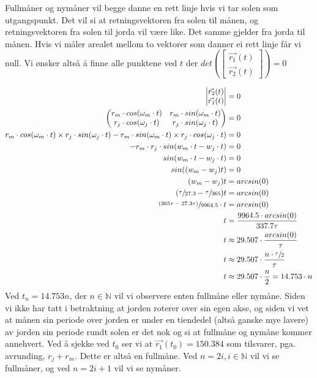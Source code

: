 \documentclass{../../myassignment}
\begin{document}
	\begin{answer}
		Fullm{\aa}ner og nym{\aa}ner vil begge danne en rett linje hvis vi tar solen som utgangspunkt. Det vil si at retningsvektoren fra solen til m{\aa}nen, og retningsvektoren fra solen til jorda vil v{\ae}re like. Det samme gjelder fra jorda til m{\aa}nen. Hvis vi m{\aa}ler arealet mellom to vektorer som danner ei rett linje f{\aa}r vi null. Vi {\o}nsker alts{\aa} {\aa} finne alle punktene ved $t$ der $det (\begin{bmatrix}{\vec{r_1}(t)} \\ {\vec{r_2}}(t)\end{bmatrix}) = 0$

		\begin{align*}
			\begin{vmatrix}{\vec{r_2}(t)} \\ \vec{r_1}(t) \end{vmatrix} &= 0\\
			\begin{pmatrix} r_m\cdot cos(\omega_m \cdot t) & r_m \cdot sin(\omega_m \cdot t) \\ r_j\cdot cos(\omega_j \cdot t) & r_j \cdot sin(\omega_j \cdot t) \end{pmatrix} &= 0 \\
			r_m\cdot cos(\omega_m \cdot t) \times r_j \cdot sin(\omega_j \cdot t) - r_m \cdot sin(\omega_m \cdot t) \times r_j\cdot cos(\omega_j \cdot t) &= 0 \\
			-r_m \cdot r_j \cdot sin(w_m \cdot t - w_j \cdot t) &= 0 \\
			sin(w_m \cdot t - w_j \cdot t) &= 0 \\
			sin((w_m - w_j)t) &= 0 \\
			(w_m - w_j)t &= arcsin(0) \\
			(\sfrac{\tau}{27.3} - \sfrac{\tau}{365})t &= arcsin(0) \\
			\sfrac{(365\tau - 27.3\tau)}{9964.5} \cdot t &= arcsin(0) \\
			t &= \dfrac{9964.5 \cdot arcsin(0)}{337.7\tau} \\
			t &\approx 29.507 \cdot \dfrac{arcsin(0)}{\tau} \\
			t &\approx 29.507 \cdot \dfrac{n \cdot \sfrac{\tau}{2}}{\tau} \\
			t &\approx 29.507 \cdot \dfrac{n}{2} = 14.753\cdot n \\
		\end{align*}
		Ved $t_n = 14.753n$, der $n \in \mathbb{N}$ vil vi observere enten fullm{\aa}ne eller nym{\aa}ne. Siden vi ikke har tatt i betraktning at jorden roterer over sin egen akse, og siden vi vet at m{\aa}nen sin periode over jorden er under en tiendedel (alts{\aa} ganske mye lavere) av jorden sin periode rundt solen er det nok og si at fullm{\aa}ne og nym{\aa}ne kommer annehvert. Ved {\aa} sjekke ved $t_0$ ser vi at $\vec{r_1}(t_0) = 150.384$ som tilsvarer, pga. avrunding, $r_j + r_m$. Dette er alts{\aa} en fullm{\aa}ne. Ved $n=2i, i\in\mathbb{N}$ vil vi se fullm{\aa}ner, og ved $n=2i+1$ vil vi se nym{\aa}ner.

	\end{answer}
\end{document}
